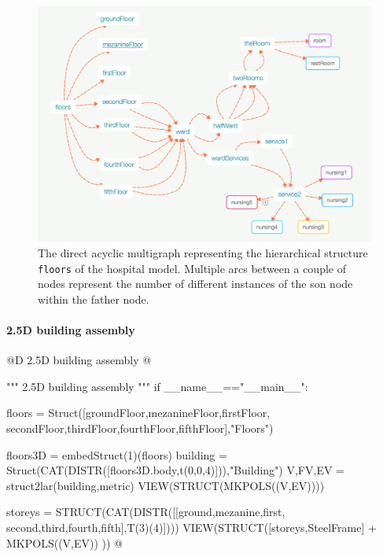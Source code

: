 \documentclass[11pt,oneside]{article}    %
\begin{document}
\begin{figure}[htbp] %
   \centering
   \includegraphics[width=\linewidth]{images/multigraph} 
   \caption{The direct acyclic multigraph representing the hierarchical structure \texttt{floors} of the hospital model. 
   Multiple arcs between a couple of nodes represent the number of different instances of the son node within the father node.}
   \label{fig:multigraph}
\end{figure}

\paragraph{2.5D building assembly}
@D 2.5D building assembly
@{""" 2.5D building assembly """       
if __name__=="__main__":
 
    floors = Struct([groundFloor,mezanineFloor,firstFloor,
                     secondFloor,thirdFloor,fourthFloor,fifthFloor],"Floors")
    
    floors3D = embedStruct(1)(floors)
    building = Struct(CAT(DISTR([floors3D.body,t(0,0,4)])),"Building")
    V,FV,EV = struct2lar(building,metric)
    VIEW(STRUCT(MKPOLS((V,EV))))
    
    storeys = STRUCT(CAT(DISTR([[ground,mezanine,first,
                    second,third,fourth,fifth],T(3)(4)])))
    VIEW(STRUCT([storeys,SteelFrame] + MKPOLS((V,EV)) ))
@}
\end{document}
